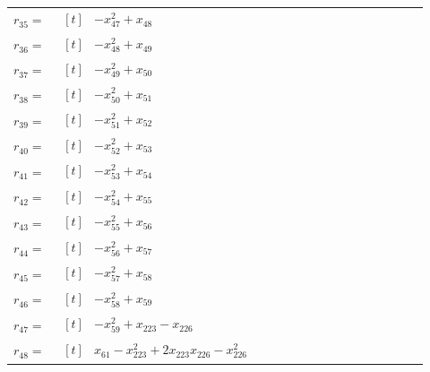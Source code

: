 \begin{longtable}{@{}r p{0.92\linewidth}@{}}
$r_{35}=$ & $\begin{aligned}[t]&-x_{47}^{2}+x_{48}\end{aligned}$ \\[2pt]
$r_{36}=$ & $\begin{aligned}[t]&-x_{48}^{2}+x_{49}\end{aligned}$ \\[2pt]
$r_{37}=$ & $\begin{aligned}[t]&-x_{49}^{2}+x_{50}\end{aligned}$ \\[2pt]
$r_{38}=$ & $\begin{aligned}[t]&-x_{50}^{2}+x_{51}\end{aligned}$ \\[2pt]
$r_{39}=$ & $\begin{aligned}[t]&-x_{51}^{2}+x_{52}\end{aligned}$ \\[2pt]
$r_{40}=$ & $\begin{aligned}[t]&-x_{52}^{2}+x_{53}\end{aligned}$ \\[2pt]
$r_{41}=$ & $\begin{aligned}[t]&-x_{53}^{2}+x_{54}\end{aligned}$ \\[2pt]
$r_{42}=$ & $\begin{aligned}[t]&-x_{54}^{2}+x_{55}\end{aligned}$ \\[2pt]
$r_{43}=$ & $\begin{aligned}[t]&-x_{55}^{2}+x_{56}\end{aligned}$ \\[2pt]
$r_{44}=$ & $\begin{aligned}[t]&-x_{56}^{2}+x_{57}\end{aligned}$ \\[2pt]
$r_{45}=$ & $\begin{aligned}[t]&-x_{57}^{2}+x_{58}\end{aligned}$ \\[2pt]
$r_{46}=$ & $\begin{aligned}[t]&-x_{58}^{2}+x_{59}\end{aligned}$ \\[2pt]
$r_{47}=$ & $\begin{aligned}[t]&-x_{59}^{2}+x_{223}-x_{226}\end{aligned}$ \\[2pt]
$r_{48}=$ & $\begin{aligned}[t]&x_{61}-x_{223}^{2}+2x_{223}x_{226}-x_{226}^{2}\end{aligned}$ \\[2pt]

\end{longtable}
